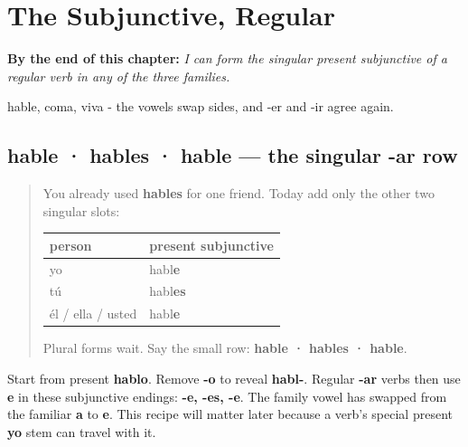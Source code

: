 
\chapter{The Subjunctive, Regular}
\label{ch:spanish-subjuntivo-regular}

\begin{chapteropening}
\textbf{By the end of this chapter:} \emph{I can form the singular present subjunctive of a regular verb in any of the three families.}

hable, coma, viva - the vowels swap sides, and -er and -ir agree again.
\end{chapteropening}

\section[hable · hables · hable]{hable · hables · hable — the singular -ar row}

\label{lesson:ES-C18-subjuntivo}



\begin{quote}
You already used \textbf{hables} for one friend. Today add only the other two singular slots:

\noindent
\begin{tabularx}{\linewidth}{@{}>{\raggedright\arraybackslash}X>{\raggedright\arraybackslash}X@{}}
\toprule
\textbf{person} & \textbf{present subjunctive} \\
\midrule
yo & habl\textbf{e} \\
tú & habl\textbf{es} \\
él / ella / usted & habl\textbf{e} \\
\bottomrule
\end{tabularx}

Plural forms wait. Say the small row: \textbf{hable · hables · hable}.
\end{quote}

\begin{grammarlens}[title={Grammar Lens: the yo stem, then a vowel swap}]
Start from present \textbf{hablo}. Remove \textbf{-o} to reveal \textbf{habl-}. Regular \textbf{-ar} verbs then use \textbf{e} in these subjunctive endings: \textbf{-e, -es, -e}. The family vowel has swapped from the familiar \textbf{a} to \textbf{e}. This recipe will matter later because a verb's special present \textbf{yo} stem can travel with it.
\end{grammarlens}

